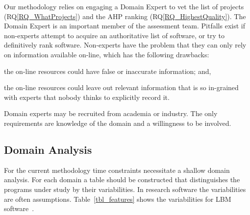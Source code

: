 \documentclass[runningheads]{llncs}
\newcommand{\rqref}[1]{RQ\ref{#1}}
\begin{document}
Our methodology relies on engaging a Domain Expert to vet the list of projects
(\rqref{RQ_WhatProjects}) and the AHP ranking (\rqref{RQ_HighestQuality}).  The
Domain Expert is an important member of the assessment
team. Pitfalls exist if non-experts attempt to acquire an authoritative list of
software, or try to definitively rank software. Non-experts have the problem
that they can only rely on information available on-line, which has the
following drawbacks:
\begin{inparaenum}[i)]
  \item the on-line resources could have false or inaccurate information; and,
  \item the on-line resources could leave out relevant information that is so
in-grained with experts that nobody thinks to explicitly record it.
\end{inparaenum}
Domain experts may be recruited from academia or industry.  The only
requirements are knowledge of the domain and a willingness to be involved.

\subsection{Domain Analysis} \label{SecDomainAnalysis}

For the current methodology time constraints necessitate a shallow domain
analysis. For each domain a table should be constructed that distinguishes the
programs under study by their variabilities.  In research software the
variabilities are often assumptions. Table~\ref{tbl_features} shows the
variabilities for LBM software~\cite{Michalski2021}.
\end{document}
